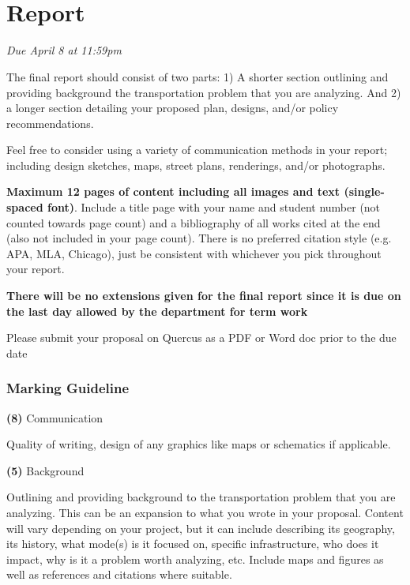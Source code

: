\documentclass[11pt]{article}
\begin{document}
	
	
	
	
	\newpage
	
	
	\section*{\\Report}
	
	\textit{Due April 8 at 11:59pm}
	
	The final report should consist of two parts: 1) A shorter section outlining and providing background the transportation problem that you are analyzing. And 2) a longer section detailing your proposed plan, designs, and/or policy recommendations.
	
	Feel free to consider using a variety of communication methods in your report; including design sketches, maps, street plans, renderings, and/or photographs.
	
	\textbf{Maximum 12 pages of content including all images and text (single-spaced font)}. Include a title page with your name and student number (not counted towards page count) and a bibliography of all works cited at the end (also not included in your page count). There is no preferred citation style (e.g. APA, MLA, Chicago), just be consistent with whichever you pick throughout your report. 
	
	\textbf{There will be no extensions given for the final report since it is due on the last day allowed by the department for term work}
	
	Please submit your proposal on Quercus as a PDF or Word doc prior to the due date
	
	
	
	

	\subsubsection*{Marking Guideline}
	
	\textbf{(8)} Communication 
	
	Quality of writing, design of any graphics like maps or schematics if applicable.
	
	\textbf{(5)} Background 
	
	Outlining and providing background to the transportation problem that you are analyzing. This can be an expansion to what you wrote in your proposal. Content will vary depending on your project, but it can include describing its geography, its history, what mode(s) is it focused on, specific infrastructure, who does it impact, why is it a problem worth analyzing, etc. Include maps and figures as well as references and citations where suitable.
	
\end{document}
